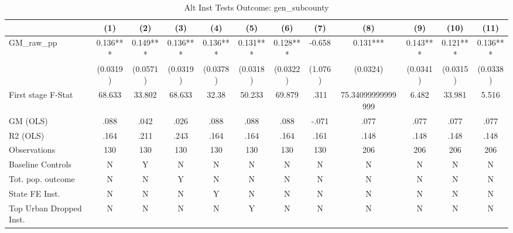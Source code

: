 \begin{table}[htbp]\centering
\def\sym#1{\ifmmode^{#1}\else\(^{#1}\)\fi}
\caption{Alt Inst Tests Outcome: gen\_subcounty}
\begin{tabular}{l*{11}{c}}
\toprule
            &\multicolumn{1}{c}{(1)}   &\multicolumn{1}{c}{(2)}   &\multicolumn{1}{c}{(3)}   &\multicolumn{1}{c}{(4)}   &\multicolumn{1}{c}{(5)}   &\multicolumn{1}{c}{(6)}   &\multicolumn{1}{c}{(7)}   &\multicolumn{1}{c}{(8)}   &\multicolumn{1}{c}{(9)}   &\multicolumn{1}{c}{(10)}   &\multicolumn{1}{c}{(11)}   \\
\midrule
GM\_raw\_pp   &    0.136***&    0.149***&    0.136***&    0.136***&    0.131***&    0.128***&   -0.658   &    0.131***&    0.143***&    0.121***&    0.136***\\
            & (0.0319)   & (0.0571)   & (0.0319)   & (0.0378)   & (0.0318)   & (0.0322)   &  (1.076)   & (0.0324)   & (0.0341)   & (0.0315)   & (0.0338)   \\
\midrule
First stage F-Stat&   68.633   &   33.802   &   68.633   &    32.38   &   50.233   &   69.879   &     .311   &75.34099999999999   &    6.482   &   33.981   &    5.516   \\
GM (OLS)    &     .088   &     .042   &     .026   &     .088   &     .088   &     .088   &    -.071   &     .077   &     .077   &     .077   &     .077   \\
R2 (OLS)    &     .164   &     .211   &     .243   &     .164   &     .164   &     .164   &     .161   &     .148   &     .148   &     .148   &     .148   \\
Observations&      130   &      130   &      130   &      130   &      130   &      130   &      130   &      206   &      206   &      206   &      206   \\
Baseline Controls&        N   &        Y   &        N   &        N   &        N   &        N   &        N   &        N   &        N   &        N   &        N   \\
Tot. pop. outcome&        N   &        N   &        Y   &        N   &        N   &        N   &        N   &        N   &        N   &        N   &        N   \\
State FE Inst.&        N   &        N   &        N   &        Y   &        N   &        N   &        N   &        N   &        N   &        N   &        N   \\
Top Urban Dropped Inst.&        N   &        N   &        N   &        N   &        Y   &        N   &        N   &        N   &        N   &        N   &        N   \\

\end{tabular}
\end{table}
